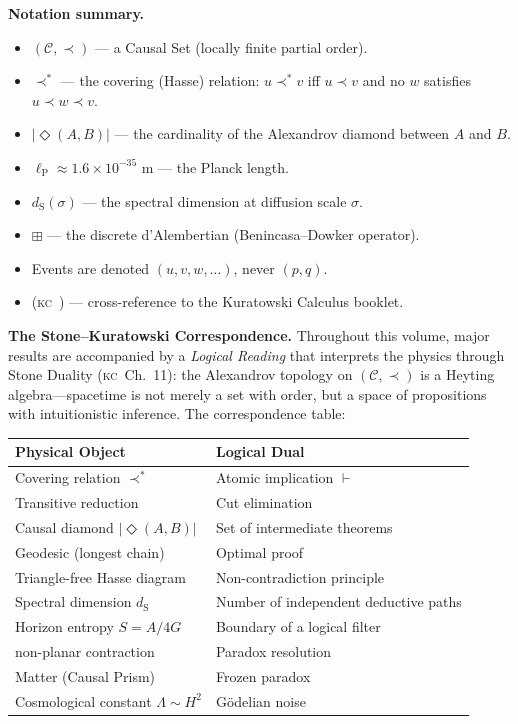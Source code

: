 \documentclass[11pt, a4paper, openany]{book}
\newcommand{\lP}{\ell_{\mathrm{P}}}
\newcommand{\dS}{d_{\mathrm{S}}}
\newcommand{\covers}{\prec^*}              %
\newcommand{\diam}[2]{|\Diamond(#1,#2)|}   %
\newcommand{\boxlayer}{\boxplus}            %
\newcommand{\KC}[1]{\textnormal{(\textsc{kc}~#1)}}
\begin{document}
\medskip\noindent
\textbf{Notation summary.}
\begin{itemize}
  \item $(\mathcal{C}, \prec)$ --- a Causal Set (locally finite partial order).
  \item $\covers$ --- the covering (Hasse) relation: $u \covers v$ iff $u \prec v$ and no $w$ satisfies $u \prec w \prec v$.
  \item $\diam{A}{B}$ --- the cardinality of the Alexandrov diamond between $A$ and $B$.
  \item $\lP \approx 1.6 \times 10^{-35}$ m --- the Planck length.
  \item $\dS(\sigma)$ --- the spectral dimension at diffusion scale $\sigma$.
  \item $\boxlayer$ --- the discrete d'Alembertian (Benincasa--Dowker operator).
  \item Events are denoted $(u, v, w, \ldots)$, never $(p, q)$.
  \item \KC{} --- cross-reference to the Kuratowski Calculus booklet.
\end{itemize}

\medskip\noindent
\textbf{The Stone--Kuratowski Correspondence.}
Throughout this volume, major results are accompanied by a \emph{Logical Reading} that interprets the physics through Stone Duality \KC{Ch.~11}: the Alexandrov topology on $(\mathcal{C}, \prec)$ is a Heyting algebra---spacetime is not merely a set with order, but a space of propositions with intuitionistic inference. The correspondence table:

\begin{center}
\begin{tabular}{@{}ll@{}}
\toprule
\textbf{Physical Object} & \textbf{Logical Dual} \\
\midrule
Covering relation $\covers$ & Atomic implication $\vdash$ \\
Transitive reduction & Cut elimination \\
Causal diamond $\diam{A}{B}$ & Set of intermediate theorems \\
Geodesic (longest chain) & Optimal proof \\
Triangle-free Hasse diagram & Non-contradiction principle \\
Spectral dimension $\dS$ & Number of independent deductive paths \\
Horizon entropy $S = A/4G$ & Boundary of a logical filter \\
non-planar contraction & Paradox resolution \\
Matter (Causal Prism) & Frozen paradox \\
Cosmological constant $\Lambda \sim H^2$ & G\"odelian noise \\
\bottomrule
\end{tabular}
\end{center}
\end{document}
